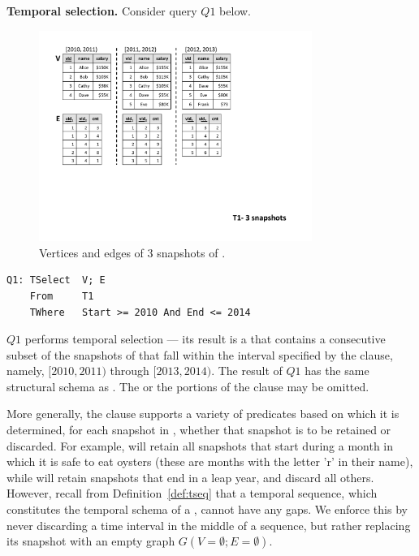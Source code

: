 {\bf Temporal selection.}  Consider query $Q1$ below.  

\begin{figure}
\includegraphics[width=3.5in]{figs/3VE.pdf}
\caption{Vertices and edges of 3 snapshots of .}
\label{fig:3ve}
\end{figure}

\begin{small}
\begin{verbatim}
Q1: TSelect  V; E
    From     T1
    TWhere   Start >= 2010 And End <= 2014
\end{verbatim}
\end{small}

$Q1$ performs temporal selection --- its result is a \tg that contains
a consecutive subset of the snapshots of  that fall within
the interval specified by the  clause, namely, $[2010,
  2011)$ through $[2013, 2014)$.  The result of $Q1$ has the same
    structural schema as . The  or the
     portions of the  clause may be omitted.

More generally, the  clause supports a variety of
predicates based on which it is determined, for each snapshot in \tg,
whether that snapshot is to be retained or discarded.  For example,
 will retain all snapshots
that start during a month in which it is safe to eat oysters (these
are months with the letter 'r' in their name), while  will retain snapshots that end in a leap year,
and discard all others.  However, recall from
Definition~\ref{def:tseq} that a temporal sequence, which constitutes
the temporal schema of a \tg, cannot have any gaps.  We enforce this
by never discarding a time interval in the middle of a sequence, but
rather replacing its snapshot with an empty graph $G(V=\emptyset;
E=\emptyset)$.  

